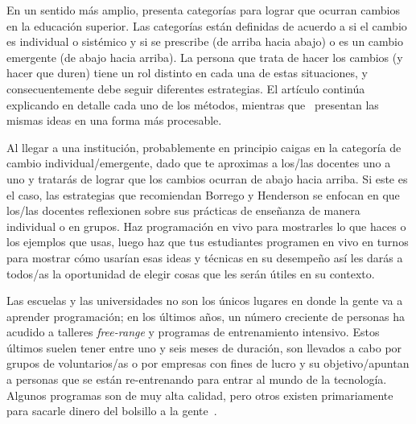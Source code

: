 En un sentido más amplio,
\cite{Borr2014} presenta categorías para lograr que ocurran cambios en la educación superior.
Las categorías están definidas de acuerdo a si el cambio es individual o 
sistémico y si se prescribe (de arriba hacia abajo) o es un cambio emergente (de abajo hacia arriba). 
La persona que trata de hacer los cambios (y hacer que duren)
tiene un rol distinto en cada una de estas situaciones,
y consecuentemente debe seguir diferentes estrategias.
El artículo continúa explicando en detalle cada uno de los métodos,
mientras que~\cite{Hend2015a,Hend2015b} presentan las mismas ideas en una forma más 
procesable.

Al llegar a una institución,
probablemente en principio caigas en la categoría de cambio individual/emergente,
dado que te aproximas a los/las docentes uno a uno
y tratarás de lograr que los cambios ocurran de abajo hacia arriba.
Si este es el caso,
las estrategias que recomiendan Borrego y Henderson se enfocan
en que los/las docentes reflexionen sobre sus prácticas de enseñanza de manera individual o en grupos.
Haz programación en vivo para mostrarles lo que haces o los ejemplos que usas,
luego haz que tus estudiantes programen en vivo en turnos 
para mostrar cómo usarían esas ideas y técnicas en su desempeño
así les darás a todos/as la oportunidad de elegir cosas que les serán útiles en su contexto.


Las escuelas y las universidades no son los únicos lugares en donde la gente va a aprender programación;
en los últimos años, un número creciente de personas ha acudido a talleres \emph{free-range} y programas de entrenamiento intensivo.
Estos últimos suelen tener entre uno y seis meses de duración,
son llevados a cabo por grupos de voluntarios/as o por empresas con fines de lucro
y su objetivo/apuntan a personas que se están re-entrenando para entrar al mundo de la tecnología.
Algunos programas son de muy alta calidad,
pero otros existen primariamente para sacarle dinero del bolsillo a la gente~\cite{McMi2017}.
 
